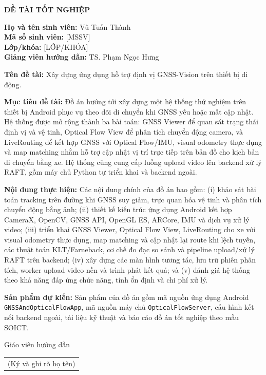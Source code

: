 \documentclass[../DoAn.tex]{subfiles}
\begin{document}
	\begin{center}
		\Large{\textbf{ĐỀ TÀI TỐT NGHIỆP}}\\
	\end{center}
	\vspace{1cm}

	\noindent\textbf{Họ và tên sinh viên:} Vũ Tuấn Thành\\
	\textbf{Mã số sinh viên:} [MSSV]\\
	\textbf{Lớp/khóa:} [LỚP/KHÓA]\\
	\textbf{Giảng viên hướng dẫn:} TS. Phạm Ngọc Hưng

	\noindent\textbf{Tên đề tài:} Xây dựng ứng dụng hỗ trợ định vị GNSS-Vision trên thiết bị di động.

	\noindent\textbf{Mục tiêu đề tài:} Đồ án hướng tới xây dựng một hệ thống thử nghiệm trên thiết bị Android phục vụ theo dõi di chuyển khi GNSS yếu hoặc mất cập nhật. Hệ thống được mở rộng thành ba bài toán: GNSS Viewer để quan sát trạng thái định vị và vệ tinh, Optical Flow View để phân tích chuyển động camera, và LiveRouting để kết hợp GNSS với Optical Flow/IMU, visual odometry thực dụng và map matching nhằm hỗ trợ cập nhật vị trí trực tiếp trên bản đồ cho kịch bản di chuyển bằng xe. Hệ thống cũng cung cấp luồng upload video lên backend xử lý RAFT, gồm máy chủ Python tự triển khai và backend ngoài.

	\noindent\textbf{Nội dung thực hiện:} Các nội dung chính của đồ án bao gồm: (i) khảo sát bài toán tracking trên đường khi GNSS suy giảm, trực quan hóa vệ tinh và phân tích chuyển động bằng ảnh; (ii) thiết kế kiến trúc ứng dụng Android kết hợp CameraX, OpenCV, GNSS API, OpenGL ES, ARCore, IMU và dịch vụ xử lý video; (iii) triển khai GNSS Viewer, Optical Flow View, LiveRouting cho xe với visual odometry thực dụng, map matching và cập nhật lại route khi lệch tuyến, các thuật toán KLT/Farneback, cơ chế đo đạc so sánh và pipeline upload/xử lý RAFT trên backend; (iv) xây dựng các màn hình tương tác, lưu trữ phiên phân tích, worker upload video nền và trình phát kết quả; và (v) đánh giá hệ thống theo khả năng đáp ứng chức năng, tính ổn định và chi phí xử lý.

	\noindent\textbf{Sản phẩm dự kiến:} Sản phẩm của đồ án gồm mã nguồn ứng dụng Android \texttt{GNSSAndOpticalFlowApp}, mã nguồn máy chủ \texttt{OpticalFlowServer}, cấu hình kết nối backend ngoài, tài liệu kỹ thuật và báo cáo đồ án tốt nghiệp theo mẫu SOICT.

	\vspace{1.5cm}
	\begin{flushright}
		Giáo viên hướng dẫn\\
		\begin{tabular}{@{}c@{}}
			(Ký và ghi rõ họ tên)
		\end{tabular}
	\end{flushright}
\end{document}
